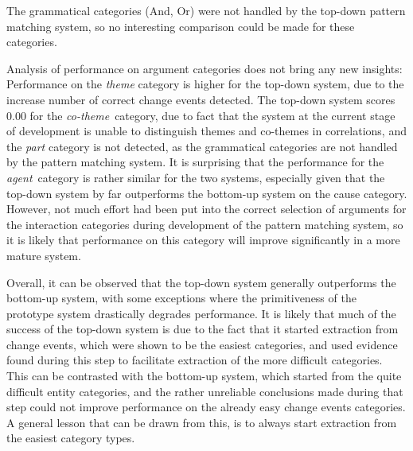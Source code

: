 The grammatical categories (And, Or) were not handled by the top-down pattern matching system, so no interesting comparison could be made for these categories.

Analysis of performance on argument categories does not bring any new insights: Performance on the \emph{theme} category is higher for the top-down system, due to the increase number of correct change events detected. The top-down system scores 0.00 for the \emph{co-theme} category, due to fact that the system at the current stage of development is unable to distinguish themes and co-themes in correlations, and the \emph{part} category is not detected, as the grammatical categories are not handled by the pattern matching system. It is surprising that the performance for the \emph{agent} category is rather similar for the two systems, especially given that the top-down system by far outperforms the bottom-up system on the cause category. However, not much effort had been put into the correct selection of arguments for the interaction categories during development of the pattern matching system, so it is likely that performance on this category will improve significantly in a more mature system.

Overall, it can be observed that the top-down system generally outperforms the bottom-up system, with some exceptions where the primitiveness of the prototype system drastically degrades performance. It is likely that much of the success of the top-down system is due to the fact that it started extraction from change events, which were shown to be the easiest categories, and used evidence found during this step to facilitate extraction of the more difficult categories. This can be contrasted with the bottom-up system, which started from the quite difficult entity categories, and the rather unreliable conclusions made during that step could not improve performance on the already easy change events categories. A general lesson that can be drawn from this, is to always start extraction from the easiest category types.